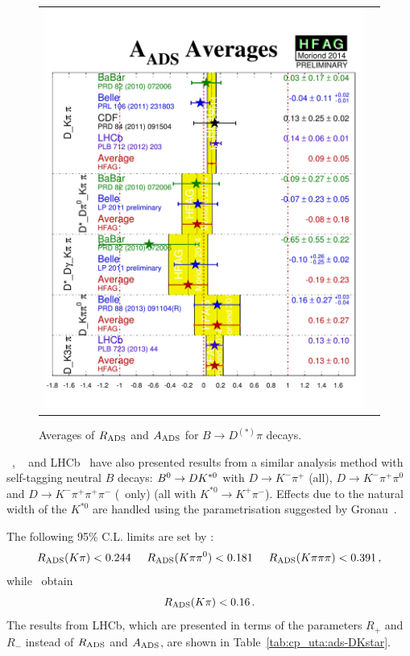 \begin{figure}[htbp]
\begin{center}
\begin{tabular}{cc}
{        \includegraphics{figures/cp_uta/A_ADS_Dpi}
      }
    \end{tabular}
  \end{center}
  \vspace{-0.8cm}
  \caption{
    Averages of $R_{\rm ADS}$ and $A_{\rm ADS}$ for $B \to D^{(*)}\pi$ decays.
  }
  \label{fig:cp_uta:cus:ads-Dpi}
\end{figure}

\babar~\cite{:2009au}, \belle~\cite{Negishi:2012uxa} and
LHCb~\cite{Aaij:2014eha} have also presented results from a similar analysis
method with self-tagging neutral $B$ decays: $B^0 \to DK^{*0}$ with $D \to K^-\pi^+$ (all), 
$D \to K^-\pi^+\pi^0$ and $D \to K^-\pi^+\pi^+\pi^-$ (\babar\ only)
(all with $K^{*0} \to K^+\pi^-$). 
Effects due to the natural width of the $K^{*0}$ are
handled using the parametrisation suggested by Gronau~\cite{Gronau:2002mu}. 

The following 95\% C.L. limits are set by \babar:
\begin{equation}
  R_{\rm ADS}(K\pi) < 0.244 \hspace{5mm}
  R_{\rm ADS}(K\pi\pi^0) < 0.181 \hspace{5mm}
  R_{\rm ADS}(K\pi\pi\pi) < 0.391 \, ,
\end{equation}
while \belle\ obtain
\begin{equation}
  R_{\rm ADS}(K\pi) < 0.16 \, .
\end{equation}
The results from LHCb, which are presented in terms of the parameters $R_+$ and $R_-$ instead of $R_{\rm ADS}$ and $A_{\rm ADS}$, are shown in Table~\ref{tab:cp_uta:ads-DKstar}.


